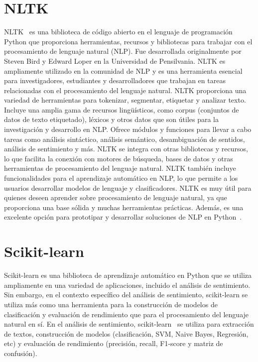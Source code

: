 \section{NLTK}
NLTK~\cite{NLTK1} es una biblioteca de código abierto en el lenguaje de programación 
Python que proporciona herramientas, recursos y bibliotecas para trabajar 
con el procesamiento de lenguaje natural (NLP). 
Fue desarrollada originalmente por Steven Bird y Edward Loper en la Universidad de Pensilvania.
NLTK es ampliamente utilizado en la comunidad de NLP y es una herramienta esencial 
para investigadores, estudiantes y desarrolladores que trabajan en tareas relacionadas 
con el procesamiento del lenguaje natural. 
NLTK proporciona una variedad de herramientas para tokenizar, segmentar, etiquetar y analizar texto.
Incluye una amplia gama de recursos lingüísticos, como corpus (conjuntos de datos de texto etiquetado), 
léxicos y otros datos que son útiles para la investigación y desarrollo en NLP.
Ofrece módulos y funciones para llevar a cabo tareas como análisis sintáctico, 
análisis semántico, desambiguación de sentidos, análisis de sentimiento y más.
NLTK se integra con otras bibliotecas y recursos, lo que facilita la conexión 
con motores de búsqueda, bases de datos y otras herramientas de procesamiento del lenguaje natural.
NLTK también incluye funcionalidades para el aprendizaje automático en NLP, 
lo que permite a los usuarios desarrollar modelos de lenguaje y clasificadores.
NLTK es muy útil para quienes deseen aprender sobre procesamiento de lenguaje natural, 
ya que proporciona una base sólida y muchas herramientas prácticas. 
Además, es una excelente opción para prototipar y desarrollar soluciones de NLP en Python~\cite{NLTK2}.


\section{Scikit-learn}
Scikit-learn es una biblioteca de aprendizaje automático en Python que se utiliza 
ampliamente en una variedad de aplicaciones, incluido el análisis de sentimiento. 
Sin embargo, en el contexto específico del análisis de sentimiento, 
scikit-learn se utiliza más como una herramienta para la construcción 
de modelos de clasificación y evaluación de rendimiento que para el 
procesamiento del lenguaje natural en sí.
En el análisis de sentimiento, scikit-learn~\cite{scikit-learn-sentiment1} se utiliza 
para extracción de textos, construcción de modelos (clasificación, SVM, Naive Bayes, Regresión, etc) y
evaluación de rendimiento (precisión, recall, F1-score y matriz de confusión).

